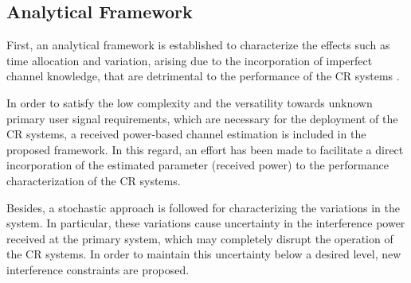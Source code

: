 \subsection*{Analytical Framework}
First, an analytical framework is established to characterize the effects such as time allocation and variation, arising due to the incorporation of imperfect channel knowledge, that are detrimental to the performance of the CR systems \cite{Kaushik16_TWC, Kaushik16_TCCN}. 

In order to satisfy the low complexity and the versatility towards unknown primary user signal requirements, which are necessary for the deployment of the CR systems, a received power-based channel estimation is included in the proposed framework. In this regard, an effort has been made to facilitate a direct incorporation of the estimated parameter (received power) to the performance characterization of the CR systems.

Besides, a stochastic approach is followed for characterizing the variations in the system. In particular, these variations cause uncertainty in the interference power received at the primary system, which may completely disrupt the operation of the CR systems. In order to maintain this uncertainty below a desired level, new interference constraints are proposed. %



